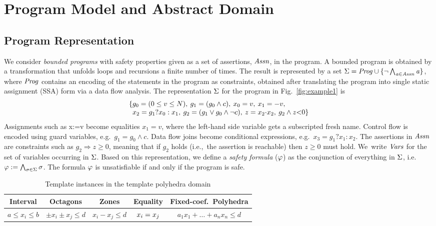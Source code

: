 \section{Program Model and Abstract Domain}\label{sec:domains}
\subsection{Program Representation}\label{sec:program}  
%
We consider \emph{bounded programs} with safety
properties given as a set of assertions, $\assertions$, in the program.
%
A bounded program is obtained by a transformation that unfolds
loops and recursions a finite number of times. The result 
is represented by a set
$\constraints=\program\cup\{\neg \bigwedge_{\assertion\in\assertions} \assertion\}$,
where $\program$ contains an encoding of the statements in the program as
constraints, obtained after translating the program
into single static assignment (SSA) form via a data flow analysis.
%
The representation $\constraints$ for the program in Fig.~\ref{fig:example1} is 
%
\begin{equation}\label{eq:ssa}
\begin{array}{l@{}l}
\{ & g_0 = (0 \leq v \leq N),\:
     g_1 = (g_0 \wedge c),\:
     x_0 = v,\:
     x_1 = -v, \\ 
  &  x_2 = g_1?x_0:x_1, \:
     g_2 = (g_1 \vee g_0\wedge \neg c), \:
     z  = x_2{\cdot}x_2,\:
     g_2 \wedge z{<}0 \}
\end{array}
\end{equation}
%
Assignments such as x:=v become equalities $x_1=v$, where the
left-hand side variable gets a subscripted fresh name.
%
Control flow is encoded using guard variables, e.g.~$g_1=g_0\wedge c$.
%
Data flow joins become conditional expressions, e.g.~$x_3=g_1?x_1:x_2$.
%
The assertions in $\assertions$ are constraints such as $g_2
\Rightarrow z\geq 0$, meaning that if $g_2$ holds
(i.e.,~the assertion is reachable) then $z \geq 0$ must hold.
%
We~write $\vars$ for the set of variables occurring in $\constraints$.  
Based on this representation, we define a \textit{safety formula}
($\formula$) as the conjunction of everything in $\constraints$, i.e.\
$\formula:= \bigwedge_{\constraint\in\constraints} \constraint$. The formula 
$\formula$ is unsatisfiable if and only if the program is safe.
%
\begin{table}[t]
\small
\begin{center}
{
\begin{tabular}{c@{\quad}|@{\quad}c@{\quad}|@{\quad}c@{\quad}|@{\quad}c@{\quad}|@{\quad}c}
Interval & Octagons & Zones & Equality & Fixed-coef.~Polyhedra \\ \hline
$a \leq x_i \leq b$ & $\pm x_i \pm x_j \leq d$ & $x_i - x_j \leq d$ & 
  $x_i=x_j\Omit{,(x_i \neq x_j)}$ & $a_1x_1 + \ldots + a_nx_n \leq d$
\end{tabular}
}
\end{center}
\caption{Template instances in the template polyhedra domain}
\label{domain}
\end{table}
%
